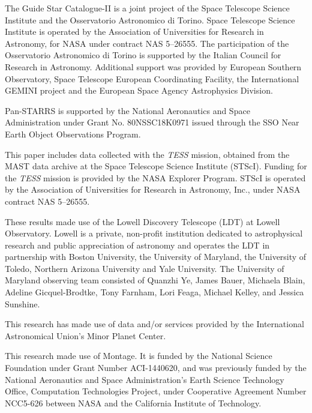 \documentclass[modern]{aastex631}
\begin{document}
\begin{CJK*}{UTF8}{gbsn}
The Guide Star Catalogue-II is a joint project of the Space Telescope Science Institute and the Osservatorio Astronomico di Torino. Space Telescope Science Institute is operated by the Association of Universities for Research in Astronomy, for NASA under contract NAS 5–26555. The participation of the Osservatorio Astronomico di Torino is supported by the Italian Council for Research in Astronomy. Additional support was provided by European Southern Observatory, Space Telescope European Coordinating Facility, the International GEMINI project and the European Space Agency Astrophysics Division.

Pan-STARRS is supported by the National Aeronautics and Space Administration under Grant No. 80NSSC18K0971 issued through the SSO Near Earth Object Observations Program.

This paper includes data collected with the {\it TESS} mission, obtained from the MAST data archive at the Space Telescope Science Institute (STScI). Funding for the {\it TESS} mission is provided by the NASA Explorer Program. STScI is operated by the Association of Universities for Research in Astronomy, Inc., under NASA contract NAS 5–26555.

These results made use of the Lowell Discovery Telescope (LDT) at Lowell Observatory. Lowell is a private, non-profit institution dedicated to astrophysical research and public appreciation of astronomy and operates the LDT in partnership with Boston University, the University of Maryland, the University of Toledo, Northern Arizona University and Yale University. The University of Maryland observing team consisted of Quanzhi Ye, James Bauer, Michaela Blain, Adeline Gicquel-Brodtke, Tony Farnham, Lori Feaga, Michael Kelley, and Jessica Sunshine. 

This research has made use of data and/or services provided by the International Astronomical Union's Minor Planet Center.

This research made use of Montage. It is funded by the National Science Foundation under Grant Number ACI-1440620, and was previously funded by the National Aeronautics and Space Administration's Earth Science Technology Office, Computation Technologies Project, under Cooperative Agreement Number NCC5-626 between NASA and the California Institute of Technology.

%


\end{CJK*}
\end{document}
